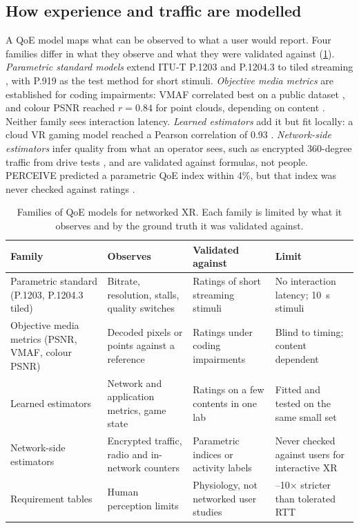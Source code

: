 \subsection{How experience and traffic are modelled}
A QoE model maps what can be observed to what a user would report. Four families differ in what they
observe and what they were validated against (\cref{tab:assure-models}). \emph{Parametric standard models}
extend ITU-T P.1203 and P.1204.3 to tiled streaming \cite{W3200608537}, with P.919 as the test method for
short stimuli. \emph{Objective media metrics} are established for coding impairments: VMAF correlated best
on a public dataset \cite{W3115841380}, and colour PSNR reached $r=0.84$ for point clouds, depending on
content \cite{W4387831705}. Neither family sees interaction latency. \emph{Learned estimators} add it but
fit locally: a cloud VR gaming model reached a Pearson correlation of 0.93 \cite{W4400981668}. \emph{Network-side estimators} infer
quality from what an operator sees, such as encrypted 360-degree traffic from drive tests
\cite{W4384158049}, and are validated against formulas, not people. PERCEIVE predicted a parametric QoE
index within 4\%, but that index was never checked against ratings
\cite{W2809912305}.

\begin{table}[t]
\centering\small
\caption{Families of QoE models for networked XR. Each family is limited by what it observes and by the
ground truth it was validated against.}\label{tab:assure-models}
\setlength{\tabcolsep}{4pt}
\begin{tabularx}{\linewidth}{@{}>{\raggedright\arraybackslash}p{3.0cm}>{\raggedright\arraybackslash}X>{\raggedright\arraybackslash}X>{\raggedright\arraybackslash}X@{}}
\toprule
Family & Observes & Validated against & Limit\\
\midrule
Parametric standard (P.1203, P.1204.3 tiled) & Bitrate, resolution, stalls, quality switches & Ratings of short streaming stimuli & No interaction latency; 10~s stimuli\\
Objective media metrics (PSNR, VMAF, colour PSNR) & Decoded pixels or points against a reference & Ratings under coding impairments & Blind to timing; content dependent\\
Learned estimators & Network and application metrics, game state & Ratings on a few contents in one lab & Fitted and tested on the same small set\\
Network-side estimators & Encrypted traffic, radio and in-network counters & Parametric indices or activity labels & Never checked against users for interactive XR\\
Requirement tables & Human perception limits & Physiology, not networked user studies & 4--10$\times$ stricter than tolerated RTT\\
\bottomrule
\end{tabularx}
\end{table}


